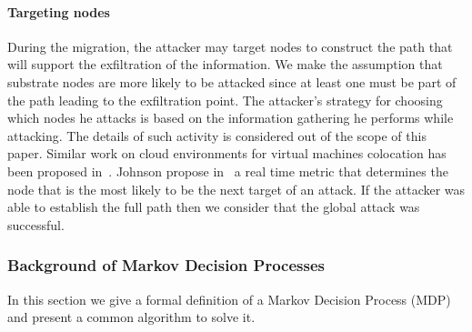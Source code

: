 \paragraph{Targeting nodes}
\label{sec:attacking}
During the migration, the attacker may target nodes to construct the path that will support the exfiltration of the information.
We make the assumption that substrate nodes are more likely to be attacked since at least one must be part of the path leading to the exfiltration point.
The attacker's strategy for choosing which nodes he attacks is based on the information gathering he performs while attacking. The details of such activity is considered out of the scope of this paper.
Similar work on cloud environments for virtual machines colocation has been proposed in~\cite{getoffmucloud-Ristenpart2009, incentivemtd-Zhang2012}.
Johnson \etal propose in~\cite{mitigateAPT-johnson2013} a real time metric that determines the node that is the most likely to be the next target of an attack.
If the attacker was able to establish the full path then we consider that the global attack was successful.

\subsubsection{Background of Markov Decision Processes}
\label{sec:mdp}
In this section we give a formal definition of a Markov Decision Process (MDP) and present a common algorithm to solve it.

